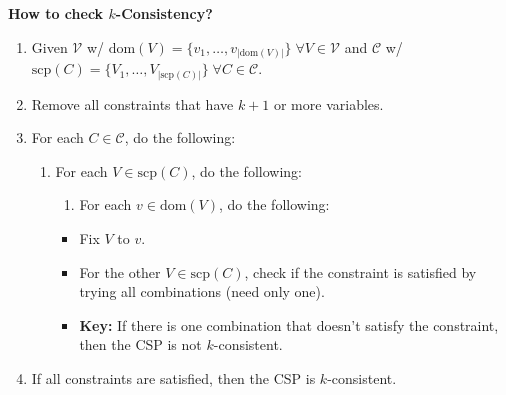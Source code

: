 \begin{process} \textbf{How to check $k$-Consistency?} 
    \begin{enumerate}
        \item Given $\mathcal{V}$ w/ $\text{dom}(V) = \{v_1,\ldots,v_{|\text{dom}(V)|}\} \; \forall V \in \mathcal{V}$ and $\mathcal{C}$ w/ $\text{scp}(C) = \{V_1,\ldots,V_{|\text{scp}(C)|}\} \; \forall C \in \mathcal{C}$.
        \item Remove all constraints that have $k+1$ or more variables.
        \item For each $C \in \mathcal{C}$, do the following:
        \begin{enumerate}
            \item For each $V \in \text{scp}(C)$, do the following:
            \begin{enumerate}
                \item For each $v \in \text{dom}(V)$, do the following:
            \end{enumerate}
            \begin{itemize}
                \item Fix $V$ to $v$.
                \item For the other $V \in \text{scp}(C)$, check if the constraint is satisfied by trying all combinations (need only one). 
                \item \textbf{Key:} If there is one combination that doesn't satisfy the constraint, then the CSP is not $k$-consistent.
            \end{itemize}
        \end{enumerate}
        \item If all constraints are satisfied, then the CSP is $k$-consistent.
    \end{enumerate}
\end{process}


